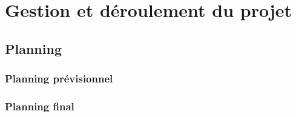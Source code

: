 \section{Gestion et déroulement du projet}

    \subsection{Planning}

        \begin{frame}
            \frametitle{Planning prévisionnel}
        \end{frame}

        \begin{frame}
            \frametitle{Planning final}
        \end{frame}

